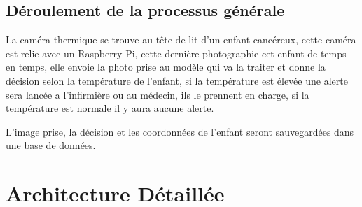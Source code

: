 \documentclass[12pt]{article}
\begin{document}
\subsection{Déroulement de la processus générale}
La caméra thermique se trouve au tête de lit d'un enfant cancéreux, cette caméra est relie avec un Raspberry Pi, cette dernière photographie cet enfant de temps en temps, elle envoie la photo prise au modèle qui va la traiter et donne la décision selon la température de l'enfant, si la température est élevée une alerte sera lancée a l'infirmière ou au médecin, ils le prennent en charge, si la température est normale il y aura aucune alerte.

L'image prise, la décision et les coordonnées de l'enfant seront sauvegardées dans une base de données.
   
\section{Architecture Détaillée}
\end{document}
